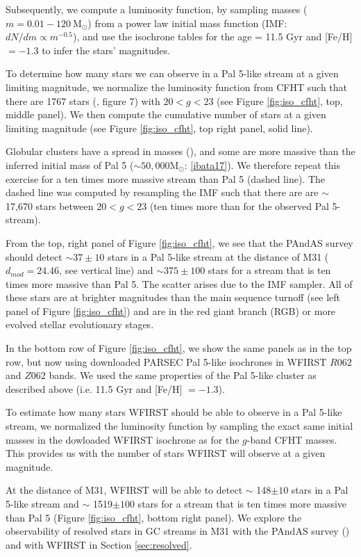 \documentclass[twocolumn]{aastex62}
\newcommand{\msun}{\textrm{M}_\odot}
\begin{document}
Subsequently, we compute a luminosity function, by sampling masses ($m = 0.01 - 120 ~\msun$) from a power law initial mass function (IMF: $dN/dm \propto m^{-0.5}$), and use the isochrone tables for the age = 11.5 Gyr and [Fe/H] $= -1.3$ to infer the stars' magnitudes. 

To determine how many stars we can observe in a Pal 5-like stream at a given limiting magnitude, we normalize the luminosity function from CFHT such that there are 1767 stars (\citealt{ibata16}, figure 7) with $20 < g < 23$ (see Figure \ref{fig:iso_cfht}, top, middle panel). We then compute the cumulative number of stars at a given limiting magnitude (see Figure \ref{fig:iso_cfht}, top right panel, solid line).

Globular clusters have a spread in masses (\citealt{harris96}), and some are more massive than the inferred initial mass of Pal 5 ($\sim 50,000 \msun$: \ref{ibata17}). We therefore repeat this exercise for a ten times more massive stream than Pal 5 (dashed line). The dashed line was computed by resampling the IMF such that there are are $\sim$ 17,670 stars between $20 < g < 23$ (ten times more than for the observed Pal 5-stream). 

From the top, right panel of Figure \ref{fig:iso_cfht}, we see that the PAndAS survey should detect $\sim 37 \pm 10$ stars in a Pal 5-like stream at the distance of M31 ($d_{mod} = 24.46$, see vertical line) and $\sim 375 \pm 100$ stars for a stream that is ten times more massive than Pal 5. The scatter arises due to the IMF sampler. All of these stars are at brighter magnitudes than the main sequence turnoff (see left panel of Figure \ref{fig:iso_cfht}) and are in the red giant branch (RGB) or more evolved stellar evolutionary stages. 

In the bottom row of Figure \ref{fig:iso_cfht}, we show the same panels as in the top row, but now using downloaded PARSEC Pal 5-like isochrones in WFIRST $R062$ and $Z062$ bands. We used the same properties of the Pal 5-like cluster as described above (i.e. 11.5 Gyr and [Fe/H] $= -1.3$). 

To estimate how many stars WFIRST should be able to observe in a Pal 5-like stream, we normalized the luminosity function by sampling the exact same initial masses in the dowloaded WFIRST isochrone as for the $g$-band CFHT masses. This provides us with the number of stars WFIRST will observe at a given magnitude. 

At the distance of M31, WFIRST will be able to detect $\sim$ 148$\pm 10$ stars in a Pal 5-like stream and $\sim$ 1519$\pm 100$ stars for a stream that is ten times more massive than Pal 5 (Figure \ref{fig:iso_cfht}, bottom right panel). We explore the observability of resolved stars in GC streams in M31 with the PAndAS survey (\citealt{mcconnachie09}) and with WFIRST in Section \ref{sec:resolved}. 
\end{document}
